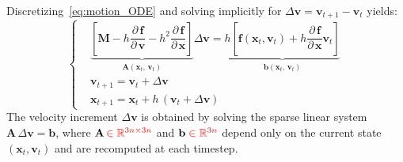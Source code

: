 \documentclass{article}
\newcommand{\pd}[2]{\dfrac{\partial\, #1}{\partial\, #2}}
\newcommand{\red}[1]{\textcolor{red}{#1}}
\begin{document}
Discretizing~\eqref{eq:motion_ODE} and solving implicitly for $\Delta\mathbf{v} = \mathbf{v}_{t+1} - \mathbf{v}_t$ yields:
\begin{equation}
\label{eq:implicit_sim_velocity_based}
    \left\{
    \begin{aligned}
        &\underbrace{\left[
            \mathbf{M} - h\pd{\mathbf{f}}{\mathbf{v}}
            - h^2 \pd{\mathbf{f}}{\mathbf{x}}
        \right]}_{\mathbf{A}(\mathbf{x}_t,\, \mathbf{v}_t)}
        \Delta\mathbf{v} = 
        \underbrace{h \left[ \mathbf{f}(\mathbf{x}_t, \mathbf{v}_t) 
        + h \pd{\mathbf{f}}{\mathbf{x}} \mathbf{v}_t \right]}_{\mathbf{b}(\mathbf{x}_t,\, \mathbf{v}_t)} \\[1ex]
        & \mathbf{v}_{t+1} = \mathbf{v}_t + \Delta\mathbf{v} \\
        & \mathbf{x}_{t+1} = \mathbf{x}_t + h\,(\mathbf{v}_t + \Delta\mathbf{v})
    \end{aligned}
    \right.
\end{equation}
The velocity increment $\Delta\mathbf{v}$ is obtained by solving the sparse linear system $\mathbf{A}\,\Delta\mathbf{v} = \mathbf{b}$, where $\mathbf{A}\,\red{\in \mathbb{R}^{3n \times 3n}}$ and $\mathbf{b}\;\red{\in \mathbb{R}^{3n}}$ depend only on the current state $(\mathbf{x}_t, \mathbf{v}_t)$ and are recomputed at each timestep.
\end{document}

